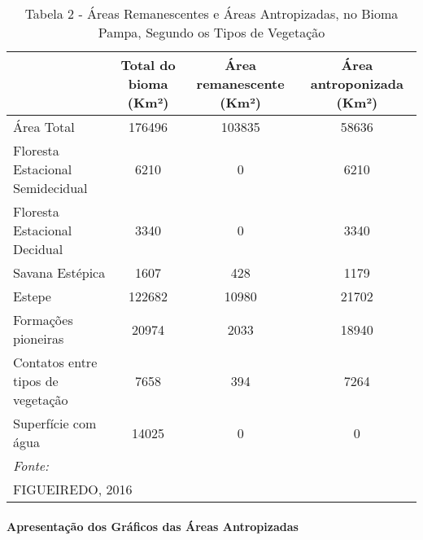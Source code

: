 \documentclass[portuguese,]{article}
\let\oldparagraph\paragraph
\renewcommand{\paragraph}[1]{\oldparagraph{#1}\mbox{}}
\begin{document}
\begin{table}[t]

\caption{\label{tab:tabela bioma}Tabela 2 - Áreas Remanescentes e Áreas Antropizadas, no Bioma Pampa, Segundo os Tipos de Vegetação}
\centering
\begin{tabular}{l|c|c|c}
\hline
  & Total do bioma (Km²) & Área remanescente (Km²) & Área antroponizada (Km²)\\
\hline
Área Total & 176496 & 103835 & 58636\\
\hline
Floresta Estacional Semidecidual & 6210 & 0 & 6210\\
\hline
Floresta Estacional Decidual & 3340 & 0 & 3340\\
\hline
Savana Estépica & 1607 & 428 & 1179\\
\hline
Estepe & 122682 & 10980 & 21702\\
\hline
Formações pioneiras & 20974 & 2033 & 18940\\
\hline
Contatos entre tipos de vegetação & 7658 & 394 & 7264\\
\hline
Superfície com água & 14025 & 0 & 0\\
\hline
\multicolumn{4}{l}{\textit{Fonte:}}\\
\multicolumn{4}{l}{FIGUEIREDO, 2016}\\
\end{tabular}
\end{table}

\paragraph{Apresentação dos Gráficos das Áreas
Antropizadas}\label{apresentacao-dos-graficos-das-areas-antropizadas}
\end{document}
